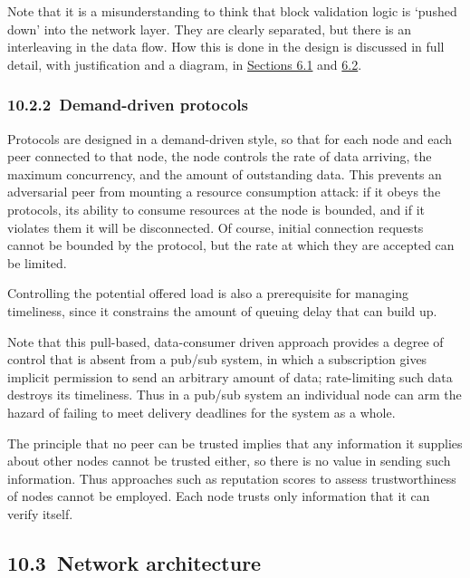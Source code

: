 \documentclass[]{article}
\begin{document}
Note that it is a misunderstanding to think that block validation logic
is `pushed down' into the network layer. They are clearly separated, but
there is an interleaving in the data flow. How this is done in the
design is discussed in full detail, with justification and a diagram, in
\protect\hyperlink{consensus-constraints-and-design-decisions}{{Sections
6.1}} and \protect\hyperlink{consensus-components}{{6.2}}.

\hypertarget{demand-driven-protocols}{%
\subsubsection{​10.2.2​~Demand-driven
protocols}\label{demand-driven-protocols}}

Protocols are designed in a demand-driven style, so that for each node
and each peer connected to that node, the node controls the rate of data
arriving, the maximum concurrency, and the amount of outstanding data.
This prevents an adversarial peer from mounting a resource consumption
attack: if it obeys the protocols, its ability to consume resources at
the node is bounded, and if it violates them it will be disconnected. Of
course, initial connection requests cannot be bounded by the protocol,
but the rate at which they are accepted can be limited.

Controlling the potential offered load is also a prerequisite for
managing timeliness, since it constrains the amount of queuing delay
that can build up.

Note that this pull-based, data-consumer driven approach provides a
degree of control that is absent from a pub/sub system, in which a
subscription gives implicit permission to send an arbitrary amount of
data; rate-limiting such data destroys its timeliness. Thus in a pub/sub
system an individual node can arm the hazard of failing to meet delivery
deadlines for the system as a whole.

The principle that no peer can be trusted implies that any information
it supplies about other nodes cannot be trusted either, so there is no
value in sending such information. Thus approaches such as reputation
scores to assess trustworthiness of nodes cannot be employed. Each node
trusts only information that it can verify itself.

\hypertarget{network-architecture}{%
\subsection{​10.3​~Network architecture}\label{network-architecture}}
\end{document}
